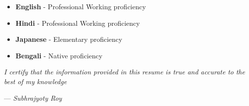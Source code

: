 \documentclass[9pt]{developercv} %
\begin{document}
\begin{minipage}{0.45\textwidth}
    \begin{itemize}[noitemsep]
        \item \textbf{English} - Professional Working proficiency
        \item \textbf{Hindi} - Professional Working proficiency
    \end{itemize}
\end{minipage}
\hfill
\begin{minipage}{0.45\textwidth}
    \begin{itemize}[noitemsep]
        \item \textbf{Japanese} - Elementary proficiency
        \item \textbf{Bengali} - Native proficiency
    \end{itemize}
\end{minipage}



\vspace{2cm}
\textit{I certify that the information provided in this resume is true and accurate to the best of my knowledge}
\begin{flushright}
    --- {\textit{Subhrajyoty Roy}}
\end{flushright}
\end{document}
